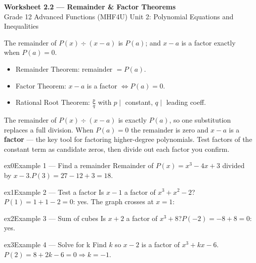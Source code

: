 \documentclass[11pt]{article}
\begin{document}
\begin{center}
{\LARGE\bfseries\color{titleblue}Worksheet 2.2 --- Remainder \& Factor Theorems}\\[2pt]
{\small Grade 12 Advanced Functions (MHF4U) \textperiodcentered{} Unit 2: Polynomial Equations and Inequalities}
\end{center}

\begin{ideabox}
The remainder of $P(x)\div(x-a)$ is $P(a)$; and $x-a$ is a factor exactly when $P(a)=0$.
\begin{itemize}[leftmargin=*,itemsep=2pt]
  \item Remainder Theorem: remainder $=P(a)$.
  \item Factor Theorem: $x-a$ is a factor $\iff P(a)=0$.
  \item Rational Root Theorem: $\tfrac{p}{q}$ with $p\mid$ constant, $q\mid$ leading coeff.
\end{itemize}
\end{ideabox}

\begin{learnbox}
The remainder of $P(x)\div(x-a)$ is exactly $P(a)$, so one substitution replaces a full division.
When $P(a)=0$ the remainder is zero and $x-a$ is a \textbf{factor} — the key tool for factoring higher-degree polynomials.
Test factors of the constant term as candidate zeros, then divide out each factor you confirm.
\end{learnbox}


\begin{example}{ex0}{Example 1 --- Find a remainder}
Remainder of $P(x)=x^3-4x+3$ divided by $x-3$.\soln $P(3)=27-12+3=18$.
\end{example}

\begin{example}{ex1}{Example 2 --- Test a factor}
Is $x-1$ a factor of $x^3+x^2-2$?\soln $P(1)=1+1-2=0$: yes. The graph crosses at $x=1$:
\end{example}

\begin{example}{ex2}{Example 3 --- Sum of cubes}
Is $x+2$ a factor of $x^3+8$?\soln $P(-2)=-8+8=0$: yes.
\end{example}

\begin{example}{ex3}{Example 4 --- Solve for k}
Find $k$ so $x-2$ is a factor of $x^3+kx-6$.\soln $P(2)=8+2k-6=0\Rightarrow k=-1$.
\end{example}
\end{document}
